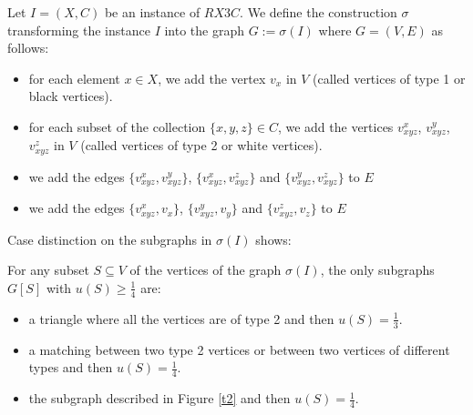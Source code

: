 \documentclass[a4paper,USenglish,cleveref, autoref]{lipics-v2021}
\begin{document}
 
\begin{definition}\label{construction}
Let $I=(X,C)$ be an instance of $RX3C$. We define the construction $\sigma$ transforming the instance $I$ into the graph $G:= \sigma(I)$ where  $G=(V,E)$  as follows: 

\begin{itemize}
    \item for each element $x \in X$, we add the vertex $v_x$ in $V$ (called vertices  of type 1 or black vertices).
    \item for each subset of the collection $\{x,y,z\} \in C$, we add the vertices $v_{xyz}^x$, $v_{xyz}^y$, $v_{xyz}^z$ in $V$ (called vertices  of type 2 or white vertices).
    \item we add the edges $\{v_{xyz}^x,v_{xyz}^y\}$, $\{v_{xyz}^x,v_{xyz}^z\}$ and $\{v_{xyz}^y,v_{xyz}^z\}$ to $E$  
    \item we add the edges $\{v_{xyz}^x,v_x\}$, $\{v_{xyz}^y,v_y\}$ and $\{v_{xyz}^z,v_z\}$ to $E$ 
\end{itemize}

\noindent
{}
\end{definition}



\noindent
Case distinction on the subgraphs in $\sigma(I)$ shows:

\begin{lemma}\label{casescubic}
For any subset $S\subseteq V$ of the vertices of the graph $\sigma(I)$, the only subgraphs $G[S]$ with $u(S) \geq \frac{1}{4}$ are:
\begin{itemize}
    \item a triangle where all the vertices are of type 2 and then $u(S) = \frac{1}{3}$.
    \item a matching between two  type 2 vertices or between  two vertices of different types and then  $u(S) =  \frac{1}{4}$.
    \item the subgraph described in Figure \ref{t2} and then $u(S) =  \frac{1}{4}$.
\end{itemize} 
\label{lem:utiliteG}
\end{lemma}
\end{document}
